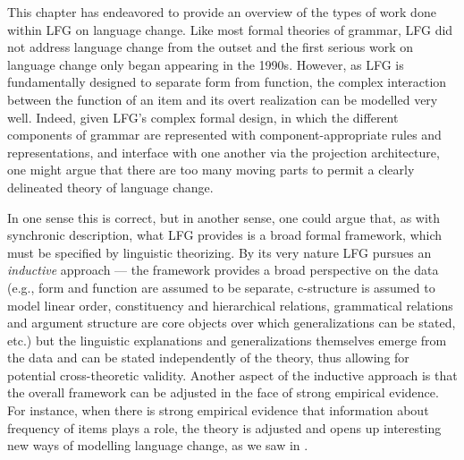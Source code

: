 \documentclass[output=paper,hidelinks]{langscibook}
\begin{document}
This chapter has endeavored to provide an overview of the types of work done within LFG on language change. Like most formal theories of grammar, LFG did not address language change from the outset and the first serious work on language change only began appearing in the 1990s.  However, as LFG is fundamentally designed to separate form from function, the complex interaction between the function of an item and its overt realization can be modelled very well.  Indeed, given LFG's complex  formal design, in which the different components of grammar %
are %
represented with component-appropriate rules and representations, and interface with one another via the projection architecture, one might argue that there are too many moving parts to permit %
a clearly delineated theory of language change. 

In one sense this is correct, but in another sense, one could argue that, as with synchronic description, what LFG provides is a broad formal framework, which must be specified by linguistic theorizing. By its very nature LFG pursues an  \textit{inductive} approach  --- the framework provides a broad perspective on the data (e.g., form and function are assumed to be separate, c-structure is assumed to model linear order, constituency and hierarchical relations, grammatical relations and argument structure are core objects over which generalizations can be stated, etc.) but the linguistic explanations and generalizations themselves emerge from the data and can be stated independently of the theory, thus allowing for potential cross-theoretic validity. 
Another aspect of the inductive approach is that the overall framework can be adjusted in the face of strong empirical evidence.
For instance, when there is strong empirical evidence that information about frequency of items plays a role, the theory is adjusted and opens up interesting new ways of modelling language change, as we saw in .
\end{document}
